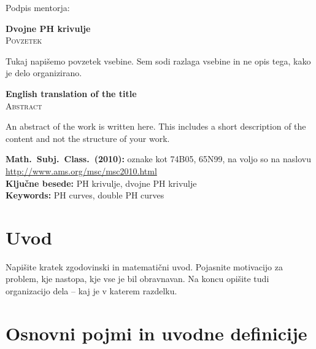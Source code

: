 \documentclass[12pt,a4paper,twoside]{article}
\newcommand{\naslovdela}{Dvojne PH krivulje}
\newcommand{\kljucnebesede}{PH krivulje\sep dvojne PH krivulje} %
\newcommand{\keywords}{PH curves\sep double PH curves} %
\newcommand{\sep}{, }  %
\theoremstyle{definition} %
\theoremstyle{plain} %
\theoremstyle{primerstyle}
\numberwithin{equation}{section}  %
\begin{document}
\vspace{2cm}
\hspace*{\fill} Podpis mentorja: \phantom{prostor za podpis}


\cleardoublepage
{}

\begin{center}
\textbf{\naslovdela} \\[3mm]
\textsc{Povzetek} \\[2mm]
\end{center}
Tukaj napišemo povzetek vsebine. Sem sodi razlaga vsebine in ne opis tega, kako je delo
organizirano.

\vfill
\begin{center}
\textbf{English translation of the title} \\[3mm] %
\textsc{Abstract}\\[2mm]
\end{center}

An abstract of the work is written here. This includes a short description of
the content and not the structure of your work.

\vfill\noindent
\textbf{Math.~Subj.~Class.~(2010):} oznake kot 74B05, 65N99, na voljo so na naslovu
\url{http://www.ams.org/msc/msc2010.html} \\[1mm]
\textbf{Ključne besede:} \kljucnebesede \\[1mm]
\textbf{Keywords:} \keywords

\cleardoublepage

\setcounter{page}{1}    %

\section{Uvod}

Napišite kratek zgodovinski in matematični uvod.  Pojasnite motivacijo za problem, kje
nastopa, kje vse je bil obravnavan. Na koncu opišite tudi organizacijo dela -- kaj je v
katerem razdelku.
\section{Osnovni pojmi in uvodne definicije}
\end{document}
